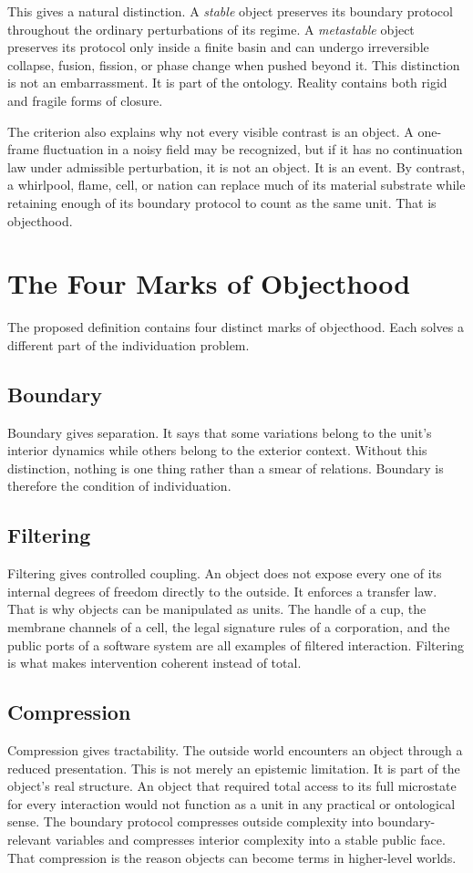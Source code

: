 \documentclass[11pt]{article}
\begin{document}
This gives a natural distinction.
A \emph{stable} object preserves its boundary protocol throughout the ordinary perturbations of its regime.
A \emph{metastable} object preserves its protocol only inside a finite basin and can undergo irreversible collapse, fusion, fission, or phase change when pushed beyond it.
This distinction is not an embarrassment.
It is part of the ontology.
Reality contains both rigid and fragile forms of closure.

The criterion also explains why not every visible contrast is an object.
A one-frame fluctuation in a noisy field may be recognized, but if it has no continuation law under admissible perturbation, it is not an object.
It is an event.
By contrast, a whirlpool, flame, cell, or nation can replace much of its material substrate while retaining enough of its boundary protocol to count as the same unit.
That is objecthood.

\section{The Four Marks of Objecthood}

The proposed definition contains four distinct marks of objecthood.
Each solves a different part of the individuation problem.

\subsection*{Boundary}
Boundary gives separation.
It says that some variations belong to the unit's interior dynamics while others belong to the exterior context.
Without this distinction, nothing is one thing rather than a smear of relations.
Boundary is therefore the condition of individuation.

\subsection*{Filtering}
Filtering gives controlled coupling.
An object does not expose every one of its internal degrees of freedom directly to the outside.
It enforces a transfer law.
That is why objects can be manipulated as units.
The handle of a cup, the membrane channels of a cell, the legal signature rules of a corporation, and the public ports of a software system are all examples of filtered interaction.
Filtering is what makes intervention coherent instead of total.

\subsection*{Compression}
Compression gives tractability.
The outside world encounters an object through a reduced presentation.
This is not merely an epistemic limitation.
It is part of the object's real structure.
An object that required total access to its full microstate for every interaction would not function as a unit in any practical or ontological sense.
The boundary protocol compresses outside complexity into boundary-relevant variables and compresses interior complexity into a stable public face.
That compression is the reason objects can become terms in higher-level worlds.
\end{document}
